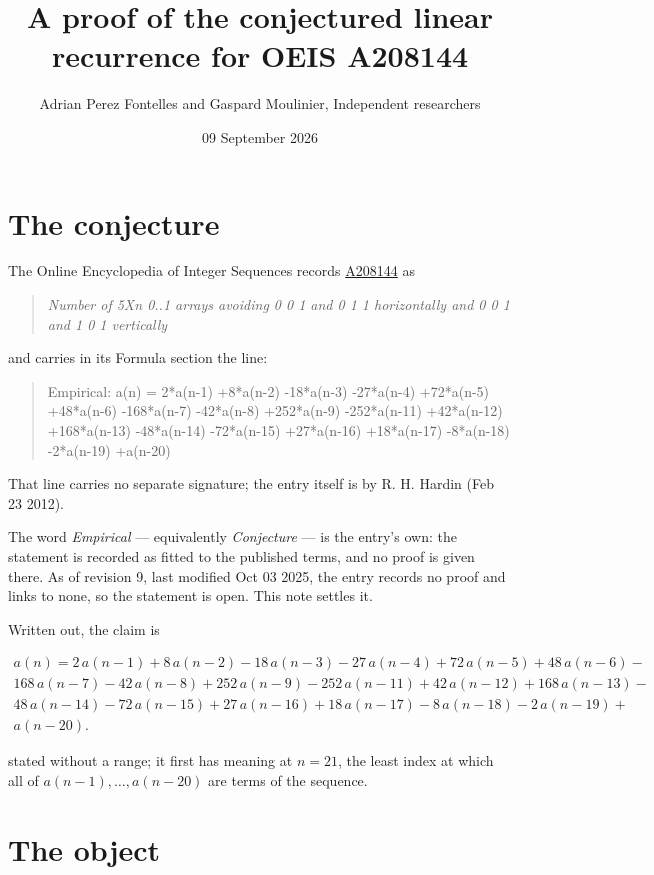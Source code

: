 \documentclass[11pt]{article}
\title{A proof of the conjectured linear recurrence for OEIS A208144}
\author{Adrian Perez Fontelles and Gaspard Moulinier, Independent researchers}
\date{09 September 2026}
\theoremstyle{definition}
\begin{document}
\maketitle
\section{The conjecture}

The Online Encyclopedia of Integer Sequences records \href{https://oeis.org/A208144}{A208144} as

\begin{quote}\itshape Number of 5Xn 0..1 arrays avoiding 0 0 1 and 0 1 1 horizontally and 0 0 1 and 1 0 1 vertically\end{quote}

and carries in its Formula section the line:

\begin{quote}\ttfamily Empirical: a(n) = 2*a(n-1) +8*a(n-2) -18*a(n-3) -27*a(n-4) +72*a(n-5) +48*a(n-6) -168*a(n-7) -42*a(n-8) +252*a(n-9) -252*a(n-11) +42*a(n-12) +168*a(n-13) -48*a(n-14) -72*a(n-15) +27*a(n-16) +18*a(n-17) -8*a(n-18) -2*a(n-19) +a(n-20)\end{quote}

That line carries no separate signature; the entry itself is by R. H. Hardin (Feb 23 2012).

The word {\itshape Empirical} --- equivalently {\itshape Conjecture} --- is the entry's own: the statement is recorded as fitted to the published terms, and no proof is given there. As of revision 9, last modified Oct 03 2025, the entry records no proof and links to none, so the statement is open. This note settles it.

Written out, the claim is

\begin{multline*} a(n) = 2\,a(n-1) + 8\,a(n-2) - 18\,a(n-3) - 27\,a(n-4) + 72\,a(n-5) + 48\,a(n-6) - \\ 168\,a(n-7) - 42\,a(n-8) + 252\,a(n-9) - 252\,a(n-11) + 42\,a(n-12) + 168\,a(n-13) - \\ 48\,a(n-14) - 72\,a(n-15) + 27\,a(n-16) + 18\,a(n-17) - 8\,a(n-18) - 2\,a(n-19) + \\ a(n-20). \end{multline*}

stated without a range; it first has meaning at $n = 21$, the least index at which all of $a(n-1),\dots,a(n-20)$ are terms of the sequence.

\section{The object}
\end{document}
